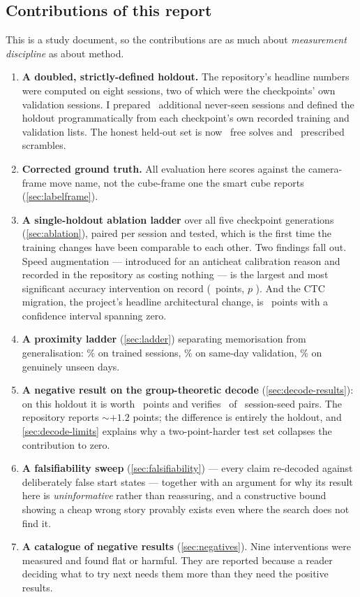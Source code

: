 \subsection{Contributions of this report}

This is a study document, so the contributions are as much about
\emph{measurement discipline} as about method.

\begin{enumerate}[leftmargin=1.4em,itemsep=3pt]
\item \textbf{A doubled, strictly-defined holdout.} The repository's headline
numbers were computed on eight sessions, two of which were the checkpoints'
own validation sessions. I prepared \NewlyPrepared\ additional never-seen
sessions and defined the holdout programmatically from each checkpoint's own
recorded training and validation lists. The honest held-out set is now
\NHoldoutSolves\ free solves and \NHoldoutScrambles\ prescribed scrambles.
\item \textbf{Corrected ground truth.} All evaluation here scores against
the camera-frame move name, not the cube-frame one the smart cube reports
(\cref{sec:labelframe}).
\item \textbf{A single-holdout ablation ladder} over all five checkpoint
generations (\cref{sec:ablation}), paired per session and tested, which is
the first time the training changes have been comparable to each other. Two
findings fall out. Speed augmentation --- introduced for an anticheat
calibration reason and recorded in the repository as costing nothing --- is
the largest and most significant accuracy intervention on record
(\DSpeedAug\ points, $p$ \DSpeedAugP). And the CTC migration, the project's
headline architectural change, is \DCtcVsPeak\ points with a confidence
interval spanning zero.
\item \textbf{A proximity ladder} (\cref{sec:ladder}) separating
memorisation from generalisation: \LadderTrain\% on trained sessions,
\LadderVal\% on same-day validation, \LadderHeld\% on genuinely unseen days.
\item \textbf{A negative result on the group-theoretic decode}
(\cref{sec:decode-results}): on this holdout it is worth \DecodeGain\ points
and verifies \DecodeVerified\ of \DecodeTrials\ session-seed pairs. The
repository reports ${\sim}+1.2$ points; the difference is entirely the
holdout, and \cref{sec:decode-limits} explains why a two-point-harder test
set collapses the contribution to zero.
\item \textbf{A falsifiability sweep} (\cref{sec:falsifiability}) --- every
claim re-decoded against deliberately false start states --- together with
an argument for why its result here is \emph{uninformative} rather than
reassuring, and a constructive bound showing a cheap wrong story provably
exists even where the search does not find it.
\item \textbf{A catalogue of negative results} (\cref{sec:negatives}). Nine
interventions were measured and found flat or harmful. They are reported
because a reader deciding what to try next needs them more than they need
the positive results.
\end{enumerate}


